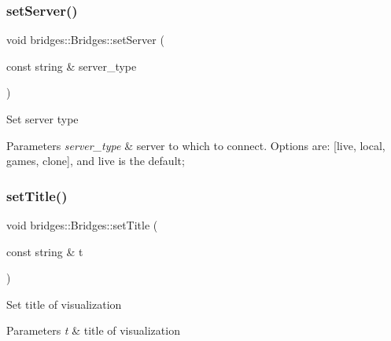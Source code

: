 \subsubsection{\texorpdfstring{set\+Server()}{setServer()}}
{\footnotesize\ttfamily void bridges\+::\+Bridges\+::set\+Server (\begin{DoxyParamCaption}\item[{const string \&}]{server\+\_\+type }\end{DoxyParamCaption})\hspace{0.3cm}{\ttfamily [inline]}}

Set server type


\begin{DoxyParams}{Parameters}
{\em server\+\_\+type} & server to which to connect. Options are\+: \mbox{[}\textquotesingle{}live\textquotesingle{}, \textquotesingle{}local\textquotesingle{}, \textquotesingle{}games\textquotesingle{}, \textquotesingle{}clone\textquotesingle{}\mbox{]}, and \textquotesingle{}live\textquotesingle{} is the default; \\
\hline
\end{DoxyParams}
\mbox{\label{classbridges_1_1_bridges_ac9f2e0b5fd5c70053db233dcbb636b56}} 
\subsubsection{\texorpdfstring{set\+Title()}{setTitle()}}
{\footnotesize\ttfamily void bridges\+::\+Bridges\+::set\+Title (\begin{DoxyParamCaption}\item[{const string \&}]{t }\end{DoxyParamCaption})\hspace{0.3cm}{\ttfamily [inline]}}

Set title of visualization


\begin{DoxyParams}{Parameters}
{\em t} & title of visualization \\
\hline
\end{DoxyParams}
\mbox{\label{classbridges_1_1_bridges_ab0b00033e54d25968f5ecb61c31c7de3}} 
